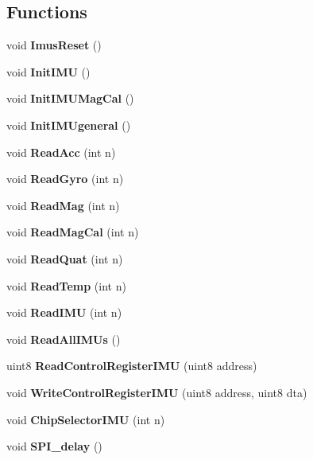 \subsection*{Functions}
\begin{DoxyCompactItemize}
\item 
\mbox{\label{_i_m_u__functions_8h_a950a5a57e4188823c580d054ed2db16a}} 
void {\bfseries Imus\+Reset} ()
\item 
\mbox{\label{_i_m_u__functions_8h_ac4f81f61837e6a132dfceb5bb93b06fa}} 
void {\bfseries Init\+I\+MU} ()
\item 
\mbox{\label{_i_m_u__functions_8h_ac95975151b543b5265bc1e470aabf465}} 
void {\bfseries Init\+I\+M\+U\+Mag\+Cal} ()
\item 
\mbox{\label{_i_m_u__functions_8h_a83f0630cb5ff556322c8cf56b6c6afc0}} 
void {\bfseries Init\+I\+M\+Ugeneral} ()
\item 
\mbox{\label{_i_m_u__functions_8h_a0290185f5b71ddb96ea13ce0a1ff48e7}} 
void {\bfseries Read\+Acc} (int n)
\item 
\mbox{\label{_i_m_u__functions_8h_ab8ae2a28912ce4a548b3603e86b22ae9}} 
void {\bfseries Read\+Gyro} (int n)
\item 
\mbox{\label{_i_m_u__functions_8h_a2ee29250f51422fa3d76df77335cce26}} 
void {\bfseries Read\+Mag} (int n)
\item 
\mbox{\label{_i_m_u__functions_8h_aad3b4856a76c623025484fe5b931bdd4}} 
void {\bfseries Read\+Mag\+Cal} (int n)
\item 
\mbox{\label{_i_m_u__functions_8h_a8eeecefb2efe7e01711fb9448c31ae76}} 
void {\bfseries Read\+Quat} (int n)
\item 
\mbox{\label{_i_m_u__functions_8h_ab0883cd12ebf2937fd6da478ac3ab976}} 
void {\bfseries Read\+Temp} (int n)
\item 
\mbox{\label{_i_m_u__functions_8h_a45df9ddb73de250cebfa02bf1d72bd97}} 
void {\bfseries Read\+I\+MU} (int n)
\item 
\mbox{\label{_i_m_u__functions_8h_a27bf3026dfe4cb0d6d255decc9944d71}} 
void {\bfseries Read\+All\+I\+M\+Us} ()
\item 
\mbox{\label{_i_m_u__functions_8h_ac1f1dc30233302bf8c1955c56ae837ae}} 
uint8 {\bfseries Read\+Control\+Register\+I\+MU} (uint8 address)
\item 
\mbox{\label{_i_m_u__functions_8h_aa907fcabe23515e5a6fb4187dd652ec3}} 
void {\bfseries Write\+Control\+Register\+I\+MU} (uint8 address, uint8 dta)
\item 
\mbox{\label{_i_m_u__functions_8h_afae3632c7d21d6a41f6999eaabf7de07}} 
void {\bfseries Chip\+Selector\+I\+MU} (int n)
\item 
\mbox{\label{_i_m_u__functions_8h_a26f85d9c393e73879461861d2ac87379}} 
void {\bfseries S\+P\+I\+\_\+delay} ()
\end{DoxyCompactItemize}


